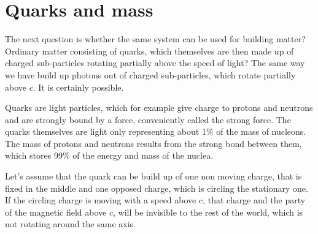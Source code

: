 \chapter{Quarks and mass}

The next question is whether the same system can be used for building matter? Ordinary matter consisting of quarks, which themselves are then made up of charged sub-particles rotating partially above the speed of light? The same way we have build up photons out of charged sub-particles, which rotate partially above $c$.    It is certainly possible. 

Quarks are light particles, which for example give charge to protons and neutrons and are strongly bound by a force, conveniently called the strong force. The quarks themselves are light only representing about 1\% of the mass of nucleons. The mass of protons and neutrons results from the strong bond between them, which stores 99\% of the energy and mass of the nuclea.

Let's assume that the quark can be build up of one non moving charge, that is fixed in the middle and one opposed charge, which is circling the stationary one. If the circling charge is moving with a speed above c, that charge and the party of the magnetic field above $c$, will be invisible to the rest of the world, which is not rotating around the same axis.

